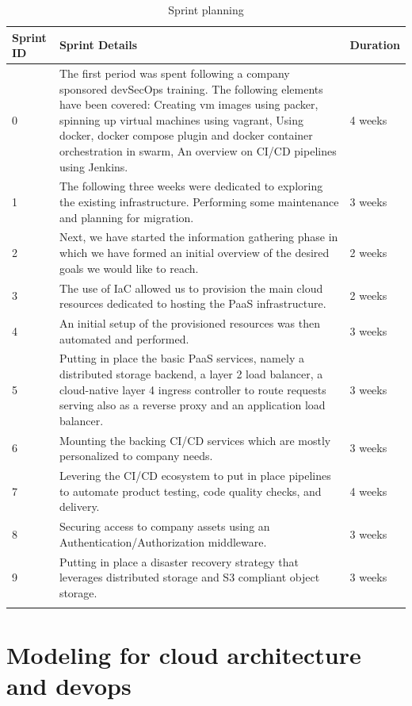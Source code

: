 \begin{longtable}[H]{|m{2cm}|m{10cm}|m{2cm}|}
\hline
 {\textbf{Sprint ID}} & {\textbf{Sprint Details }} & {\textbf{Duration }} \\ \hline 
0 
&
The first period was spent following a company sponsored devSecOps training. The following elements have been covered: 
Creating vm images using packer, spinning up virtual machines using vagrant,  
Using docker, docker compose plugin and docker container orchestration in swarm, 
An overview on CI/CD pipelines using Jenkins. 
&
4 weeks  \\
\hline
1 
&
The following three weeks were dedicated to exploring the existing infrastructure. Performing some maintenance and planning for migration. 
&
3 weeks  \\ \hline
2 
&
Next, we have started the information gathering phase in which we have formed an initial overview of the desired goals we would like to reach. 
&
2 weeks \\ \hline
3 
&
The use of IaC allowed us to provision the main cloud resources dedicated to hosting the PaaS infrastructure. 
&
2 weeks \\ \hline
4 
&
An initial setup of the provisioned resources was then automated and performed. 
&
3 weeks \\ \hline
5 
&
Putting in place the basic PaaS services, namely a distributed storage backend, a layer 2 load balancer, a cloud-native layer 4 ingress controller to route requests serving also as a reverse proxy and an application load balancer. 
&
3 weeks \\ \hline
6 
&
Mounting the backing CI/CD services which are mostly personalized to company needs. 
&
3 weeks \\ \hline
7 
&
Levering the CI/CD ecosystem to put in place pipelines to automate product testing, code quality checks, and delivery. 
&
4 weeks \\ \hline
8 
&
Securing access to company assets using an Authentication/Authorization middleware. 
&
3 weeks \\ \hline
9 
&
Putting in place a disaster recovery strategy that leverages distributed storage and S3 compliant object storage. 
&
3 weeks \\ \hline

\caption{ Sprint planning}
\end{longtable}


\section{Modeling for cloud architecture and devops }

